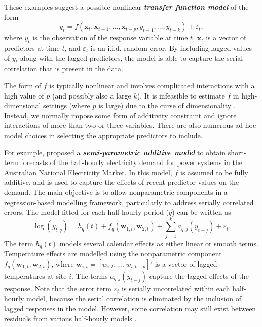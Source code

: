 \documentclass[
  11pt,
  a4paper,
]{article}
\begin{document}
These examples suggest a possible nonlinear \textbf{\emph{transfer
function model}} of the form \[
 y_t = f(\bm{x}_{t}, \bm{x}_{t-1}, \dots,\bm{x}_{t-p}, y_{t-1},\dots,y_{t-k}) + \varepsilon_{t},
\] where \(y_{t}\) is the observation of the response variable at time
\(t\), \(\bm{x}_{t}\) is a vector of predictors at time \(t\), and
\(\varepsilon_{t}\) is an i.i.d. random error. By including lagged
values of \(y_{t}\) along with the lagged predictors, the model is able
to capture the serial correlation that is present in the data.

The form of \(f\) is typically nonlinear and involves complicated
interactions with a high value of \(p\) (and possibly also a large
\(k\)). It is infeasible to estimate \(f\) in high-dimensional settings
(where \(p\) is large) due to the curse of dimensionality
\autocite{Bellman57,Stone82}. Instead, we normally impose some form of
additivity constraint and ignore interactions of more than two or three
variables. There are also numerous ad hoc model choices in selecting the
appropriate predictors to include.

For example, \textcite{FH2012} proposed a \textbf{\emph{semi-parametric
additive model}} to obtain short-term forecasts of the half-hourly
electricity demand for power systems in the Australian National
Electricity Market. In this model, \(f\) is assumed to be fully
additive, and is used to capture the effects of recent predictor values
on the demand. The main objective is to allow nonparametric components
in a regression-based modelling framework, particularly to address
serially correlated errors. The model fitted for each half-hourly period
(\(q\)) can be written as \[
 \log(y_{t,q}) = h_{q}(t) + f_{q}(\bm{w}_{1,t},\bm{w}_{2,t}) + \sum_{j=1}^k a_{q,j}(y_{t-j}) + \varepsilon_{t}.
\] The term \(h_{q}(t)\) models several calendar effects as either
linear or smooth terms. Temperature effects are modelled using the
nonparametric component \(f_{q}(\bm{w}_{1,t},\bm{w}_{2,t})\), where
\(\bm{w}_{i,t} = [w_{i,t},\dots,w_{i,t-p}]'\) is a vector of lagged
temperatures at site \(i\). The terms \(a_{q,j}(y_{t-j})\) capture the
lagged effects of the response. Note that the error term
\(\varepsilon_{t}\) is serially uncorrelated within each half-hourly
model, because the serial correlation is eliminated by the inclusion of
lagged responses in the model. However, some correlation may still exist
between residuals from various half-hourly models \autocite{FH2012}.
\end{document}
